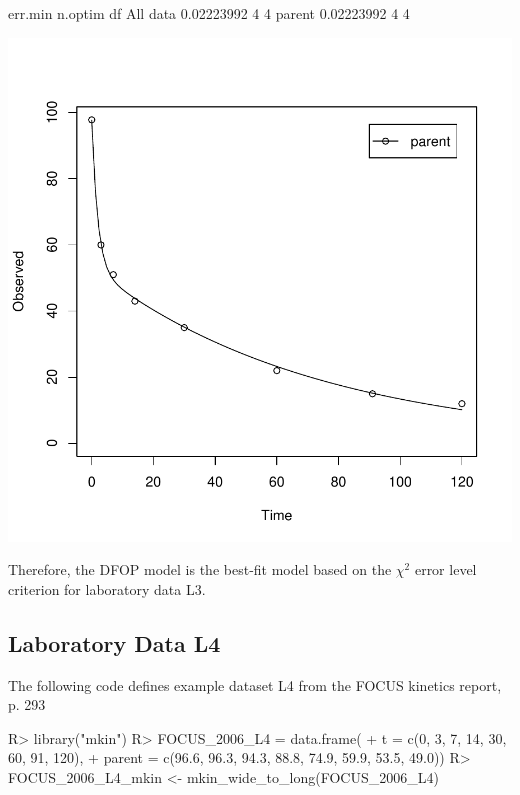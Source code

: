 \documentclass[12pt,a4paper]{article}
\begin{document}
\begin{Schunk}
\begin{Soutput}
            err.min n.optim df
All data 0.02223992       4  4
parent   0.02223992       4  4
\end{Soutput}
\end{Schunk}
\includegraphics{examples-L3_DFOP}

Therefore, the DFOP model is the best-fit model based on the $\chi^2$ error
level criterion for laboratory data L3.

\subsection{Laboratory Data L4}

The following code defines example dataset L4 from the FOCUS kinetics
report, p. 293

\begin{Schunk}
\begin{Sinput}
R> library("mkin")
R> FOCUS_2006_L4 = data.frame(
+   t = c(0, 3, 7, 14, 30, 60, 91, 120),
+   parent = c(96.6, 96.3, 94.3, 88.8, 74.9, 59.9, 53.5, 49.0))
R> FOCUS_2006_L4_mkin <- mkin_wide_to_long(FOCUS_2006_L4)
\end{Sinput}
\end{Schunk}
\end{document}
